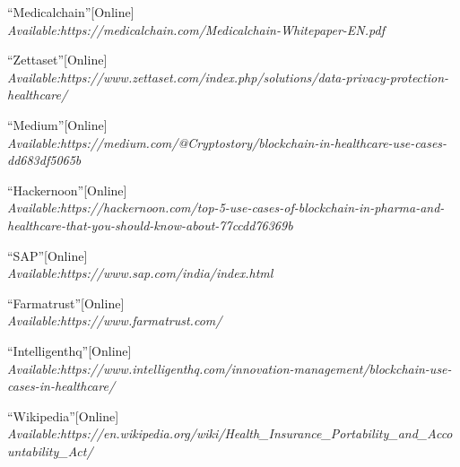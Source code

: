 \documentclass[12pt]{report}
\begin{document}
\begin{thebibliography}{100}
 \textquotedblleft Medicalchain\textquotedblright[Online]\\ 
\textit{Available:https://medicalchain.com/Medicalchain-Whitepaper-EN.pdf}

 \textquotedblleft Zettaset\textquotedblright[Online]\\ 
\textit{Available:https://www.zettaset.com/index.php/solutions/data-privacy-protection-healthcare/}

 \textquotedblleft Medium\textquotedblright[Online]\\ 
\textit{Available:https://medium.com/@Cryptostory/blockchain-in-healthcare-use-cases-dd683df5065b}


 \textquotedblleft Hackernoon\textquotedblright[Online]\\ 
\textit{Available:https://hackernoon.com/top-5-use-cases-of-blockchain-in-pharma-and-healthcare-that-you-should-know-about-77ccdd76369b}

 \textquotedblleft SAP\textquotedblright[Online]\\ 
\textit{Available:https://www.sap.com/india/index.html}

 \textquotedblleft Farmatrust\textquotedblright[Online]\\ 
\textit{Available:https://www.farmatrust.com/}

 \textquotedblleft Intelligenthq\textquotedblright[Online]\\ 
\textit{Available:https://www.intelligenthq.com/innovation-management/blockchain-use-cases-in-healthcare/}

 \textquotedblleft Wikipedia\textquotedblright[Online]\\ 
\textit{Available:https://en.wikipedia.org/wiki/Health_Insurance_Portability_and_Accountability_Act/}


\vspace{2cm}

\end{thebibliography}
\end{document}
